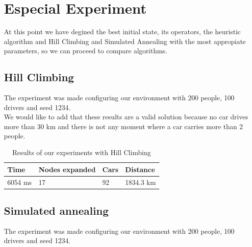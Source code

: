 \documentclass[12]{article}
\begin{document}
\section{Especial Experiment}

At this point we have degined the best initial state, its operators, the heuristic algorithm and Hill Climbing and Simulated Annealing with the most appropiate parameters, so we can proceed to compare algorithms. 


\subsection{Hill Climbing}

The experiment was made configuring our environment with 200 people, 100 drivers and seed 1234.
\\

We would like to add that these results are a valid solution because no car drives more than 30 km and there is not any moment where a car carries more than 2 people. 
\\

\begin{table}[h]
\centering
\begin{tabular}{|l|l|l|l|}
\hline \textbf{Time} &
 \textbf{Nodes expanded} & \textbf{Cars} & \textbf{Distance}\\  \hline
6054 ms &  17 & 92 & 1834.3 km \\ \hline
\end{tabular}
\caption{Results of our experiments with Hill Climbing}
\label{Results}
\end{table}

\subsection{Simulated annealing}
The experiment was made configuring our environment with 200 people, 100 drivers and seed 1234.
\\
\end{document}
